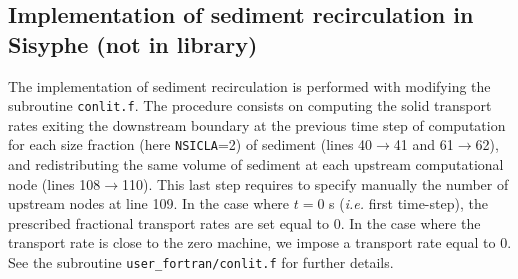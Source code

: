 \subsection{Implementation of sediment recirculation in Sisyphe (not in library)}
The implementation of sediment recirculation is performed with modifying the subroutine \texttt{conlit.f}.
The procedure consists on computing the solid transport rates exiting the downstream boundary at the previous time step of computation for each size fraction (here \texttt{NSICLA}=2) of sediment (lines 40$\rightarrow$41 and 61$\rightarrow$62), and redistributing the same volume of sediment at each upstream computational node (lines 108$\rightarrow$110). This last step requires to specify manually the number of upstream nodes at line 109. In the case where $t=0$ s ({\it i.e.} first time-step), the prescribed fractional transport rates are set equal to 0. In the case where the transport rate is close to the zero machine, we impose a transport rate equal to 0. See the subroutine \texttt{user\_fortran/conlit.f} for further details.
      

